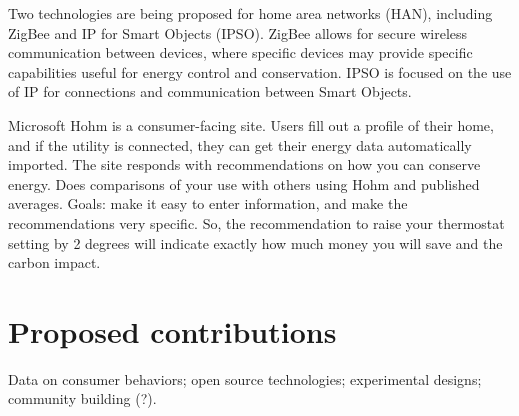 Two technologies are being proposed for home area networks (HAN), including ZigBee and IP for Smart Objects (IPSO).
ZigBee allows for secure wireless communication between devices, where specific devices may provide specific capabilities useful for energy control and conservation.
IPSO is focused on the use of IP for connections and communication between Smart Objects.


Microsoft Hohm is a consumer-facing site.  Users fill out a profile of
their home, and if the utility is connected, they can get their energy data
automatically imported.  The site responds with recommendations on how you
can conserve energy. Does comparisons of your use with others using Hohm
and
published averages.   Goals: make it easy to enter information, and make
the recommendations very specific.  So, the recommendation to raise your
thermostat setting by 2 degrees will indicate exactly how much money you
will save and the carbon impact.


\section{Proposed contributions}

Data on consumer behaviors; open source technologies; experimental designs;
community building (?).


 











